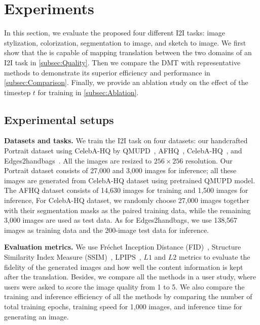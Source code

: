 \section{Experiments}\label{sec:exp}


In this section, we evaluate the proposed \method {} four different I2I tasks: image stylization, colorization, segmentation to image, and sketch to image.
%
We first show that the \method is capable of mapping translation between the two domains of an I2I task in \cref{subsec:Quality}.
%
Then\sqq{,} we compare the DMT with  representative methods to demonstrate its superior efficiency and performance in \cref{subsec:Comparison}.
%
Finally, we provide an ablation study on the effect of the timestep $t$ for training in \cref{subsec:Ablation}.

\subsection{Experimental setups}\label{subsec:Setup}

\noindent\textbf{Datasets and tasks.}
%
We train the I2I task on four datasets: our handcrafted Portrait dataset using CelebA-HQ by QMUPD~\cite{YiLLR22}, AFHQ~\cite{choi2020stargan}, CelebA-HQ~\cite{karras2018progressive}, and Edges2handbags~\cite{zhu2016generative,xie15hed}.
%
All the images are resized to $256\times256$ resolution.
%
Our Portrait dataset consists of 27,000  and 3,000 images for inference; all these images are generated from  CelebA-HQ dataset using  pretrained QMUPD model.
%
The AFHQ dataset consists of 14,630 images for training and 1,500 images for inference, 
%
For  CelebA-HQ dataset, we randomly choose 27,000 images together with their segmentation masks as the paired training data, while the remaining 3,000 images are used as test data.
%
As for Edges2handbags, we use  138,567 images as training data and the 200-image test data for inference.

\noindent\textbf{Evaluation metrics.} 
%
We use Fr\'{e}chet Inception Distance (FID)~\cite{heusel2017gans}, Structure Similarity Index Measure (SSIM)~\cite{wang2004image}, LPIPS~\cite{zhang2018unreasonable}, $L1$ and $L2$ metrics to evaluate the fidelity of the generated images and how well the content information is kept after the translation.
%
Besides, we compare all the methods in a user study, where users were asked to score the image quality from 1 to 5.
%
We also compare the training and inference efficiency of all the methods by comparing the number of total training epochs, training speed for 1,000 images, and inference time for generating an image.


